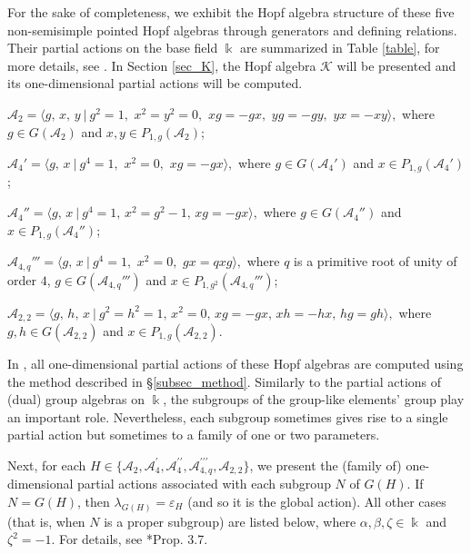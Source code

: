\documentclass[reqno]{amsart}
\theoremstyle{definition}
\numberwithin{equation}{section}\theoremstyle{plain}
\theoremstyle{definition}
\def \k {\Bbbk}
\def \K {\mathcal{K}}
\begin{document}
\begin{itemize}
\medbreak

For the sake of completeness, we exhibit the Hopf algebra structure of these five non-semisimple pointed Hopf algebras through generators and defining relations. Their partial actions on the base field \(\k\) are summarized in Table \ref{table},
for more details, see \cite{corresponding}.
In Section \ref{sec_K}, the Hopf algebra $\K$ will be presented and its one-dimensional partial actions will be computed.

\smallbreak

$\mathcal{A}_{2} =  \langle g, \, x, \, y  \  |  \ g^2 =1, \,\, x^2=y^2=0, \,\, xg = -gx, \,\, yg=-gy, \,\, yx=-xy \rangle ,$ where $g \in G(\mathcal{A}_{2})$ and $x, y \in P_{1,g}(\mathcal{A}_{2})$;

\smallbreak

$\mathcal{A}_{4}' = \langle g, \, x \  | \ g^4 =1, \,\, x^2=0, \,\, xg = -gx \rangle ,$ where $g \in G(\mathcal{A}_{4}')$ and $x \in P_{1,g}(\mathcal{A}_{4}')$;

\smallbreak

$\mathcal{A}_{4}'' = \langle g, \, x \ | \ g^4 =1, \, x^2=g^2-1, \, xg=-gx\rangle ,$ where $g \in G(\mathcal{A}_{4}'')$ and $x \in P_{1,g}(\mathcal{A}_{4}'')$;

\smallbreak

$\mathcal{A}_{4,q}''' = \langle g, \, x \ | \  g^4 =1, \,\, x^2=0, \,\, gx = qxg \rangle,$ where $q$ is a primitive root of unity of order $4$, $g \in G(\mathcal{A}_{4,q}''')$ and $x \in P_{1,g^2}(\mathcal{A}_{4,q}''')$;

\smallbreak

$\mathcal{A}_{2,2} = \langle g, \, h, \, x \  | \ g^2 = h^2 = 1, \, x^2=0, \, xg = -gx, \, xh = -hx, \, hg=gh \rangle,$ where $g,h \in G(\mathcal{A}_{2,2})$ and $x \in P_{1,g}(\mathcal{A}_{2,2})$.

\smallbreak


  \end{itemize} 
  

\medbreak

In \cite{corresponding}, all one-dimensional partial actions of these Hopf algebras are computed using the method described in \S \ref{subsec_method}.
Similarly to the partial actions of (dual) group algebras on $\Bbbk$, the subgroups of the group-like elements' group play an important role.
Nevertheless, each subgroup sometimes gives rise to a single partial action but sometimes to a family of one or two parameters. 

Next, for each $H \in \{ \mathcal{A}_2, \mathcal{A}_4^\prime, \mathcal{A}_4^{\prime \prime}, \mathcal{A}_{4,q}^{\prime \prime \prime}, \mathcal{A}_{2,2}\}$, we present the (family of) one-dimensional partial actions associated with each subgroup $N$ of $G(H)$. 
If $N=G(H)$, then $\lambda_{G(H)}=\varepsilon_{H}$ (and so it is the global action). All other cases (that is, when $N$ is a proper subgroup) are listed below,  where $\alpha, \beta, \zeta \in \k$ and $\zeta^2=-1$. For details, see \cite{corresponding}*{Prop. 3.7}.
\end{document}
